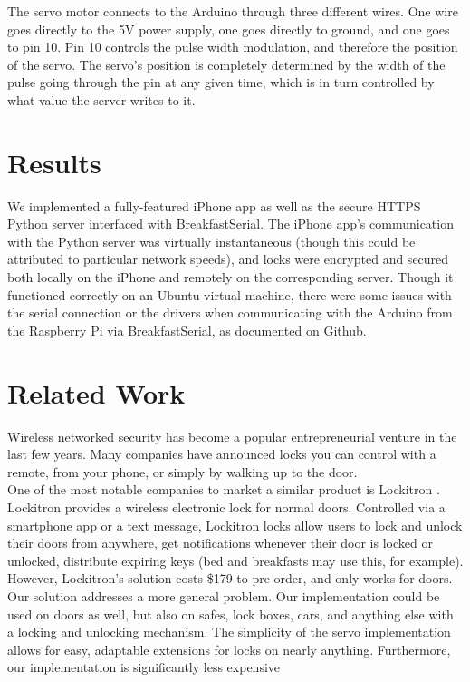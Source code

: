 \documentclass[10pt]{article}
\begin{document}
\begin{multicols}{2}
The servo motor connects to the Arduino through three different wires. One wire goes directly to the 5V power supply, one goes directly to ground, and one goes to pin 10. Pin 10 controls the pulse width modulation, and therefore the position of the servo. The servo's position is completely determined by the width of the pulse going through the pin at any given time, which is in turn controlled by what value the server writes to it. \\


\section{Results}
We implemented a fully-featured iPhone app as well as the secure HTTPS Python server interfaced with BreakfastSerial. The iPhone app's communication with the Python server was virtually instantaneous (though this could be attributed to particular network speeds), and locks were encrypted and secured both locally on the iPhone and remotely on the corresponding server. Though it functioned correctly on an Ubuntu virtual machine, there were some issues \cite{breakfastserialissue} with the serial connection or the drivers when communicating with the Arduino from the Raspberry Pi via BreakfastSerial, as documented on Github. 

\section{Related Work}
Wireless networked security has become a popular entrepreneurial venture in the last few years. Many companies have announced locks you can control with a remote, from your phone, or simply by walking up to the door. \\

One of the most notable companies to market a similar product is Lockitron \cite{lockitron}. Lockitron provides a wireless electronic lock for normal doors. Controlled via a smartphone app or a text message, Lockitron locks allow users to lock and unlock their doors from anywhere, get notifications whenever their door is locked or unlocked, distribute expiring keys (bed and breakfasts may use this, for example). \\

However, Lockitron's solution costs \$179 to pre order, and only works for doors. Our solution addresses a more general problem. Our implementation could be used on doors as well, but also on safes, lock boxes, cars, and anything else with a locking and unlocking mechanism. The simplicity of the servo implementation allows for easy, adaptable extensions for locks on nearly anything. Furthermore, our implementation is significantly less expensive\\


\end{multicols}
\end{document}
